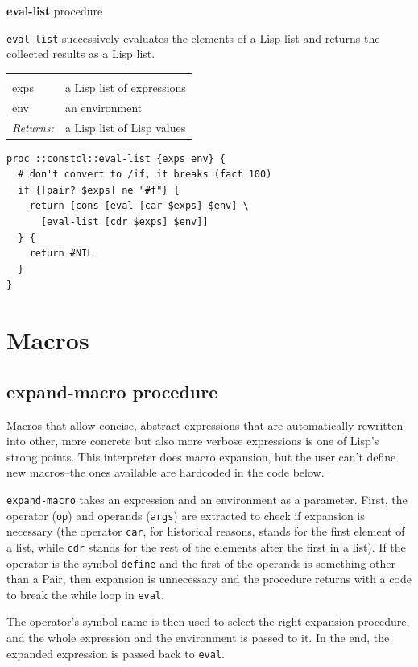 \documentclass[twoside,9pt]{report}
\begin{document}
\textbf{eval-list} procedure


\texttt{eval-list} successively evaluates the elements of a Lisp list and returns the collected results as a Lisp list.

\noindent\begin{tabular}{ |p{1.5cm} p{8cm}| }
\hline
\rowcolor[HTML]{CCCCCC} \multicolumn{2}{|l|}{\bf eval-list (internal)} \\
exps & a Lisp list of expressions \\
env & an environment \\
\textit{Returns:} & a Lisp list of Lisp values \\
\hline
\end{tabular}
\begin{lstlisting}
proc ::constcl::eval-list {exps env} {
  # don't convert to /if, it breaks (fact 100)
  if {[pair? $exps] ne "#f"} {
    return [cons [eval [car $exps] $env] \
      [eval-list [cdr $exps] $env]]
  } {
    return #NIL
  }
}
\end{lstlisting}
\section{Macros}
\label{macros}
\subsection{expand-macro procedure}
\label{expand-macro-procedure}


Macros that allow concise, abstract expressions that are automatically rewritten into other, more concrete but also more verbose expressions is one of Lisp's strong points. This interpreter does macro expansion, but the user can't define new macros--the ones available are hardcoded in the code below.


\texttt{expand-macro} takes an expression and an environment as a parameter. First, the operator (\texttt{op}) and operands (\texttt{args}) are extracted to check if expansion is necessary (the operator \texttt{car}, for historical reasons, stands for the first element of a list, while \texttt{cdr} stands for the rest of the elements after the first in a list). If the operator is the symbol \texttt{define} and the first of the operands is something other than a Pair, then expansion is unnecessary and the procedure returns with a code to break the while loop in \texttt{eval}.


The operator's symbol name is then used to select the right expansion procedure, and the whole expression and the environment is passed to it. In the end, the expanded expression is passed back to \texttt{eval}.
\end{document}
